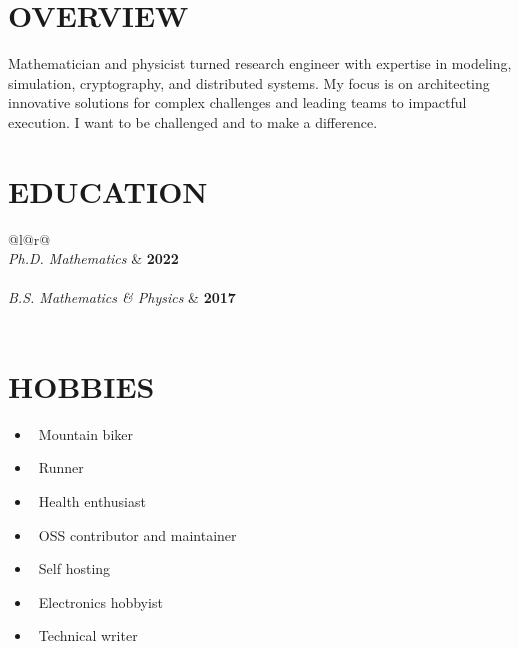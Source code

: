 \begin{minipage}[t]{0.35\textwidth}
    \section*{OVERVIEW}
    Mathematician and physicist turned research engineer with expertise in modeling, simulation, cryptography, and distributed systems. 
    My focus is on architecting innovative solutions for complex challenges and leading teams to impactful execution. 
    I want to be challenged and to make a difference.
    
    \section*{EDUCATION}
    \vspace{-2pt} 
    \begin{tabular*}{\textwidth}{@{}l@{\extracolsep{\fill}}r@{}}
       \\[2pt] 
      \textit{\large Ph.D. Mathematics} & \textbf{\small 2022} \\
       \\[3pt] 
      \textit{\large B.S. Mathematics \& Physics} & \textbf{\small 2017} \\
       \\
    \end{tabular*}
    \vspace{-7pt} 
    \section*{HOBBIES}
    \begin{itemize}[leftmargin=0in, label={}, itemsep=2pt]
        \item \small \faBiking~Mountain biker
        \item \small \faRunning~Runner
        \item \small \faHeart~Health enthusiast
        \item \small \faCode~OSS contributor and maintainer
        \item \small \faServer~Self hosting
        \item \small \faMicrochip~Electronics hobbyist
        \item \small \faChalkboardTeacher~Technical writer
    \end{itemize}
\end{minipage}%

